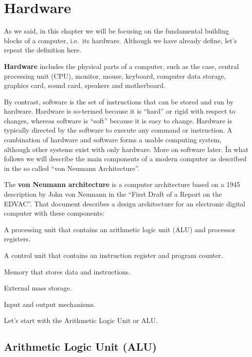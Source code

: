 \section{Hardware}

As we said, in this chapter we will be focusing on the fundamental building blocks of a computer, i.e.\ its hardware.
Although we have already define, let's repeat the definition here.

\bd[Hardware]
\textbf{Hardware} includes the physical parts of a computer, such as the case, central processing unit (CPU),
monitor, mouse, keyboard, computer data storage, graphics card, sound card, speakers and motherboard.
\ed

By contrast, software is the set of instructions that can be stored and run by hardware. Hardware is so-termed
because it is ``hard'' or rigid with respect to changes, whereas software is ``soft'' because it is easy to change.
Hardware is typically directed by the software to execute any command or instruction. A combination of hardware and
software forms a usable computing system, although other systems exist with only hardware. More on software later. \v

In what follows we will describe the main components of a modern computer as described in the so called ``von Neumann
Architecture''.

The \textbf{von Neumann architecture} is a computer architecture based on a 1945 description by John von Neumann in
the ``First Draft of a Report on the EDVAC''. That document describes a design architecture for an electronic digital
computer with these components:
\bit
\item A processing unit that contains an arithmetic logic unit (ALU) and processor registers.
\item A control unit that contains an instruction register and program counter.
\item Memory that stores data and instructions.
\item External mass storage.
\item Input and output mechanisms.
\eit
\ed


Let's start with the Arithmetic Logic Unit or ALU.

\subsection{Arithmetic Logic Unit (ALU)}

